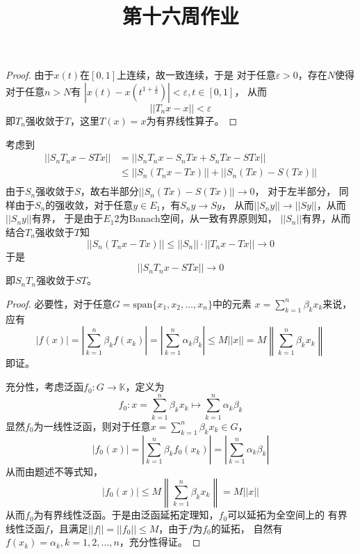 \documentclass[cn]{homework}
\title{第十六周作业}
\begin{document}
    \maketitle

    \problem
    \begin{proof}
        由于$x(t)$在$[0,1]$上连续，故一致连续，于是
        对于任意$\varepsilon>0$，存在$N$使得对于任意$n>N$有
        $\left|x(t)-x(t^{1+\frac{1}{n}})\right|<\varepsilon,t\in[0,1]$，
        从而
        \[||T_n x-x||<\varepsilon\]
        即$T_n$强收敛于$T$，这里$T(x)=x$为有界线性算子。

    \end{proof}
    
    \problem
    考虑到
    \[\begin{aligned}
        ||S_nT_nx-STx||&=||S_nT_nx-S_nTx+S_nTx-STx||\\
        &\leq||S_n(T_nx-Tx)||+||S_n(Tx)-S(Tx)||\\
    \end{aligned}\]
    由于$S_n$强收敛于$S$，故右半部分$||S_n(Tx)-S(Tx)||\to 0$，
    对于左半部分，
    同样由于$S_n$的强收敛，对于任意$y\in E_1$，有$S_ny\to Sy$，
    从而$||S_ny||\to ||Sy||$，从而$||S_ny||$有界，
    于是由于$E_1$2为Banach空间，从一致有界原则知，
    $||S_n||$有界，从而结合$T_n$强收敛于$T$知
    \[||S_n(T_nx-Tx)||\leq ||S_n||\cdot||T_nx-Tx||\to 0\]
    于是
    \[||S_nT_nx-STx||\to 0\]
    即$S_nT_n$强收敛于$ST$。

    \problem
    \begin{proof}
        必要性，对于任意$G=\mathrm{span}\{x_1,x_2,\ldots,x_n\}$中的元素
        $x=\sum_{k=1}^n\beta_kx_k$来说，
        应有
        \[|f(x)|=\left|\sum_{k=1}^n\beta_kf(x_k)\right|
        =\left|\sum_{k=1}^n\alpha_k\beta_k\right|
        \leq M||x||=M\left\|\sum_{k=1}^n\beta_kx_k\right\|\]
        即证。

        充分性，考虑泛函$f_0:G\to\mathbb K$，定义为
        \[f_0:x=\sum_{k=1}^n\beta_kx_k\mapsto\sum_{k=1}^n\alpha_k\beta_k\]
        显然$f_0$为一线性泛函，则对于任意$x=\sum_{k=1}^n\beta_kx_k\in G$，
        \[|f_0(x)|=\left|\sum_{k=1}^n\beta_kf_0(x_k)\right|
        =\left|\sum_{k=1}^n\alpha_k\beta_k\right|\]
        从而由题述不等式知，
        \[|f_0(x)|\leq M\left\|\sum_{k=1}^n\beta_kx_k\right\|=M||x||\]
        从而$f_0$为有界线性泛函。于是由泛函延拓定理知，$f_0$可以延拓为全空间上的
        有界线性泛函$f$，且满足$||f||=||f_0||\leq M$，由于$f$为$f_0$的延拓，
        自然有$f(x_k)=\alpha_k,k=1,2,\ldots,n$，充分性得证。
    \end{proof}
\end{document}

